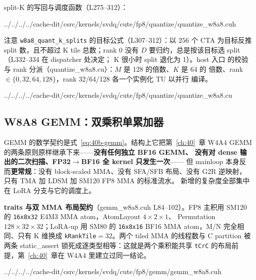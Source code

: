 split-K 的写回与调度函数（L275--312）：

\begin{lstinputlisting}[linerange={275-312},firstnumber=auto,
  title={quantize\_w8a8.cuh L275--312（split-K 原子写回、finalize 与 k\_splits 目标）}]{../../../../cache-dit/csrc/kernels/svdq/cute/fp8/quantize/quantize_w8a8.cuh}
\end{lstinputlisting}

注意 \texttt{w8a8\_quant\_k\_splits} 的目标公式（L307--312）：以
$256$ 个 CTA 为目标反推 split 数，且不超过 K tile 总数；rank 0 没有
$D$ 要归约，总是按该目标选 split（L332--334 在 dispatcher 处决定；
K 很小时 split 退化为 1）。host 入口
的校验与 rank 分派（quantize\_w8a8.cu）：$M$ 是 128 的倍数、$K$ 是 64 的
倍数、rank $\in\{0,32,64,128\}$，rank 32/64/128 各一个实例化 TU 以并行
编译。

\begin{lstinputlisting}[linerange={52-64},firstnumber=auto,
  title={quantize\_w8a8.cu L52--64（host 几何与 dtype 约束）}]{../../../../cache-dit/csrc/kernels/svdq/cute/fp8/quantize/quantize_w8a8.cu}
\end{lstinputlisting}

\subsection{W8A8 GEMM：双乘积单累加器}\label{sec:40b-gemm}

GEMM 的数学契约是式~\eqref{eq:40b-gemm}。结构上它把第~\ref{ch:40}~章
W4A4 GEMM 的两条原则原样继承下来——\textbf{没有任何独立 BF16 GEMM、
没有对 dense 输出的二次扫描、FP32$\to$BF16 全 kernel 只发生一次}——
但 mainloop 本身反而\textbf{更常规}：没有 block-scaled MMA、没有 SFA/SFB
布局、没有 G2R 逆映射，只有 TMA 加 LDSM 加 SM120 FP8 MMA 的标准流水。
新增的复杂度全部集中在 LoRA 分支与它的调度上。

\textbf{traits 与双 MMA 布局契约}（gemm\_w8a8.cuh L84--102）。FP8 主积用
SM120 的 \texttt{16x8x32} E4M3 MMA atom，AtomLayout $4\times2\times1$、
Permutation $128\times32\times32$；LoRA-up 用 SM80 的
\texttt{16x8x16} BF16 MMA atom，M/N 完全相同、只有 K 维换成
\texttt{kRankTile}$=32$。两个 tiled MMA 的线程数与 C partition 被两条
static\_assert 锁死成逐类型相等：这就是两个乘积能共享
\texttt{tCrC} 的布局前提，第~\ref{ch:40}~章在 W4A4 里建立过同一结论。

\begin{lstinputlisting}[linerange={84-102},firstnumber=auto,
  title={gemm\_w8a8.cuh L84--102（E4M3/BF16 双 MMA atom 与共享累加器的 static\_assert）}]{../../../../cache-dit/csrc/kernels/svdq/cute/fp8/gemm/gemm_w8a8.cuh}
\end{lstinputlisting}

